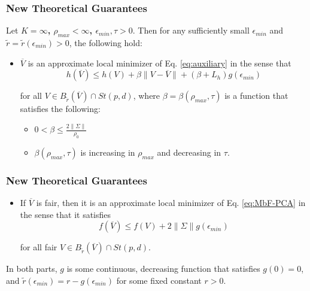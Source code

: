 \documentclass{beamer}
\begin{document}
\begin{frame}
	\frametitle{New Theoretical Guarantees}
	\begin{theorem}
		\label{thm:mbfpca-another}
		Let {\bf\color{red} $K = \infty$, $\rho_{max} < \infty$, $\epsilon_{min}, \tau > 0$}. 
		Then for any sufficiently small $\epsilon_{min}$ and  $\tilde{r} = \tilde{r}(\epsilon_{min}) > 0$,
		the following hold:
		
		\begin{itemize}
			\item $\overline{V}$ is an approximate local minimizer of Eq. \eqref{eq:auxiliary} in the sense that
			\begin{equation}
				h(\overline{V}) \leq h(V) + \beta \lVert V - \overline{V} \rVert + (\beta + L_h) g(\epsilon_{min})
			\end{equation}
			
			for all $V \in B_{\tilde{r}}(\overline{V}) \cap St(p, d)$, where $\beta = \beta(\rho_{max}, \tau)$ is a function that satisfies the following:
			\begin{itemize}
				\item $0 < \beta \leq \frac{2 \lVert \Sigma \rVert}{\rho_0}$
				
				\item $\beta(\rho_{max}, \tau)$ is increasing in $\rho_{max}$ and decreasing in $\tau$.
			\end{itemize}
		\end{itemize}
	\end{theorem}
\end{frame}

\begin{frame}
	\frametitle{New Theoretical Guarantees}
	\begin{theorem}
		\begin{itemize}
			\item If $\overline{V}$ is fair, then it is an approximate local minimizer of Eq. \eqref{eq:MbF-PCA} in the sense that it satisfies
			\begin{equation}
				f(\overline{V}) \leq f(V) + 2 \lVert \Sigma \rVert g(\epsilon_{min})
			\end{equation}
			
			for all fair $V \in B_{\tilde{r}}(\overline{V}) \cap St(p, d)$.
		\end{itemize}
		
		In both parts, $g$ is some continuous, decreasing function that satisfies $g(0) = 0$, and $\tilde{r}(\epsilon_{min}) = r - g(\epsilon_{min})$ for some fixed constant $r > 0$.
	\end{theorem}
\end{frame}
\end{document}
